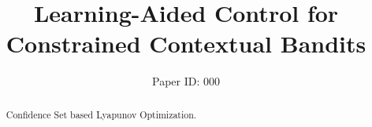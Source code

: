 \documentclass[letterpaper]{article}
\begin{document}
%
\title{Learning-Aided Control for Constrained Contextual Bandits}
\author{Paper ID: 000}
\maketitle
\begin{abstract}
Confidence Set based Lyapunov Optimization.
\end{abstract}



















\end{document}
